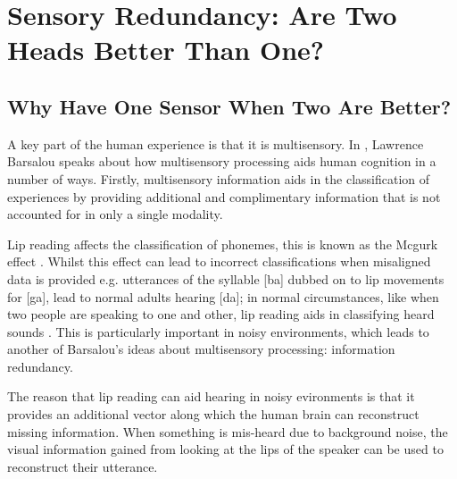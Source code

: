 
\chapter{Sensory Redundancy: Are Two Heads Better Than One?} %

\label{Chapter4} %



\section{Why Have One Sensor When Two Are Better?}
A key part of the human experience is that it is multisensory. In \cite{barsalou2008grounded}, Lawrence Barsalou speaks about how multisensory processing aids human cognition in a number of ways. Firstly, multisensory information aids in the classification of experiences by providing additional and complimentary information that is not accounted for in only a single modality. 

Lip reading affects the classification of phonemes, this is known as the Mcgurk effect \cite{mcgurk1976hearing}. Whilst this effect can lead to incorrect classifications when misaligned data is provided e.g. utterances of the syllable [ba] dubbed on to lip movements for [ga], lead to normal adults hearing [da]; in normal circumstances, like when two people are speaking to one and other, lip reading aids in classifying heard sounds \cite{ma2009lip}. This is particularly important in noisy environments, which leads to another of Barsalou's ideas about multisensory processing: information redundancy.

The reason that lip reading can aid hearing in noisy evironments is that it provides an additional vector along which the human brain can reconstruct missing information. When something is mis-heard due to background noise, the visual information gained from looking at the lips of the speaker can be used to reconstruct their utterance.

